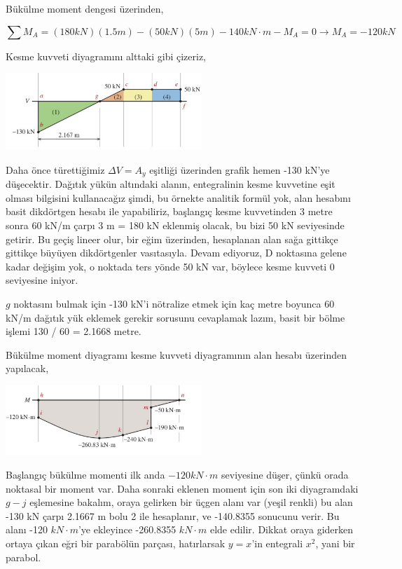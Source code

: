 \documentclass[12pt,fleqn]{article}\usepackage{../../common}
\begin{document}
Bükülme moment dengesi üzerinden,

$$
\sum M_A = (180 kN)(1.5 m) - (50 kN)(5 m) - 140 kN \cdot m - M_A = 0 \to M_A =
-120 kN
$$

Kesme kuvveti diyagramını alttaki gibi çizeriz,

\includegraphics[width=20em]{phy_020_strs_02_21.jpg}

Daha önce türettiğimiz $\Delta V = A_y$ eşitliği üzerinden grafik hemen -130
kN'ye düşecektir. Dağıtık yükün altındaki alanın, entegralinin kesme kuvvetine
eşit olması bilgisini kullanacağız şimdi, bu örnekte analitik formül yok, alan
hesabını basit dikdörtgen hesabı ile yapabiliriz, başlangıç kesme kuvvetinden 3
metre sonra 60 kN/m çarpı 3 m = 180 kN eklenmiş olacak, bu bizi 50 kN
seviyesinde getirir. Bu geçiş lineer olur, bir eğim üzerinden, hesaplanan alan
sağa gittikçe gittikçe büyüyen dikdörtgenler vasıtasıyla.  Devam ediyoruz, D
noktasına gelene kadar değişim yok, o noktada ters yönde 50 kN var, böylece
kesme kuvveti 0 seviyesine iniyor.

$g$ noktasını bulmak için -130 kN'i nötralize etmek için kaç metre boyunca 60
kN/m dağıtık yük eklemek gerekir sorusunu cevaplamak lazım, basit bir bölme
işlemi 130 / 60 = 2.1668 metre.

Bükülme moment diyagramı kesme kuvveti diyagramının alan hesabı üzerinden
yapılacak,

\includegraphics[width=20em]{phy_020_strs_02_22.jpg}

Başlangıç bükülme momenti ilk anda $-120 kN \cdot m$ seviyesine düşer, çünkü
orada noktasal bir moment var. Daha sonraki eklenen moment için son iki
diyagramdaki $g-j$ eşlemesine bakalım, oraya gelirken bir üçgen alanı var (yeşil
renkli) bu alan -130 kN çarpı 2.1667 m bolu 2 ile hesaplanır, ve -140.8355
sonucunu verir. Bu alanı -120 $kN \cdot m$'ye ekleyince -260.8355 $kN \cdot m$
elde edilir. Dikkat oraya giderken ortaya çıkan eğri bir parabölün parçası,
hatırlarsak $y=x$'in entegrali $x^2$, yani bir parabol.
\end{document}
